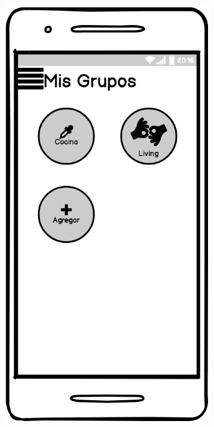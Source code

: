 \begin{figure}[H]
\begin{subfigure}[b]{0.20\textwidth}
    \label{fig:balsamiq}
  \end{subfigure}
  \begin{subfigure}[b]{0.20\textwidth}
    \includegraphics[width=\textwidth, keepaspectratio]{images/balsamiq10}

\end{subfigure}
\end{figure}
